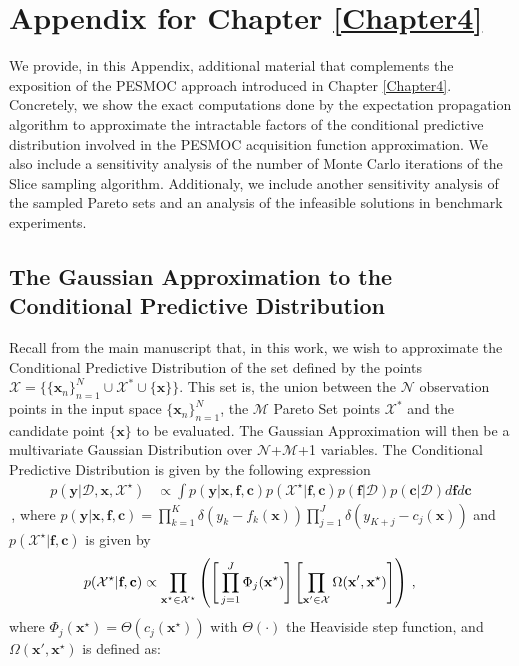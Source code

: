 
\chapter{Appendix for Chapter \ref{Chapter4}}
\label{AppendixB}

We provide, in this Appendix, additional material that complements the exposition of the PESMOC approach introduced in Chapter \ref{Chapter4}. Concretely, we show the exact computations done by the expectation propagation algorithm to approximate the intractable factors of the conditional predictive distribution involved in the PESMOC acquisition function approximation. We also include a sensitivity analysis of the number of Monte Carlo iterations of the Slice sampling algorithm. Additionaly, we include another sensitivity analysis of the sampled Pareto sets and an analysis of the infeasible solutions in benchmark experiments.

\section{The Gaussian Approximation to the Conditional Predictive Distribution}

Recall from the main manuscript that, in this work, we wish to approximate the Conditional Predictive Distribution of the set defined by the points $\mathcal{X} = \{\{\boldsymbol{x}_n\}_{n=1}^{N} \cup \mathcal{X}^* \cup \{\boldsymbol{x}\}\}$. This set is, the union between the $\mathcal{N}$ observation points in the input space $\{\boldsymbol{x}_n\}_{n=1}^{N}$, the $\mathcal{M}$ Pareto Set points $\mathcal{X}^*$ and the candidate point $\{\boldsymbol{x}\}$ to be evaluated. The Gaussian Approximation will then be a multivariate Gaussian Distribution over $\mathcal{N}$+$\mathcal{M}$+1 variables. The Conditional Predictive Distribution is given by the following expression
\begin{align}
p(\textbf{y}|\mathcal{D}, \textbf{x}, \mathcal{X}^{\star}) & \propto 
        \int p(\textbf{y}|\textbf{x},\textbf{f},\textbf{c}) 
        p(\mathcal{X}^{\star}|\textbf{f},\textbf{c}) p(\textbf{f}|\mathcal{D}) p(\textbf{c}|\mathcal{D})
 d\textbf{f} d\textbf{c}
\end{align}\,,
where $p(\textbf{y}|\textbf{x},\textbf{f},\textbf{c}) = \prod_{k=1}^{K}\delta(y_k - f_k(\textbf{x})) 
\prod_{j=1}^{J}\delta (y_{K+j} - c_j(\textbf{x}))$ and $p(\mathcal{X}^{\star}|\textbf{f},\textbf{c})$ is given by
\begin{align}
\hspace{-.2cm}
p(\mathcal{X}^{\star}|\textbf{f},\textbf{c}) & \propto 
        \prod_{\textbf{x}^\star\in \mathcal{X}^\star} 
        \left(
        \Bigg[\prod_{j=1}^{J}\Phi_j(\textbf{x}^{\star})\Bigg]
        \left[ 
        \prod_{\textbf{x}'\in \mathcal{X}} 
        \Omega(\textbf{x}',\textbf{x}^{\star})
        \right] 
        \right)
        \,,
        \label{eq:x_star}
\end{align}
where $\Phi_j(\mathbf{x}^\star) = \Theta(c_j(\mathbf{x}^\star))$ with $\Theta(\cdot)$ the Heaviside step function,
and $\Omega(\textbf{x}',\textbf{x}^{\star})$ is defined as:


